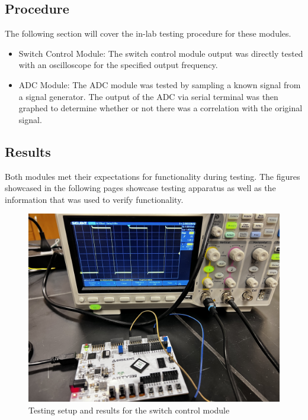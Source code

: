 \documentclass[titlepage]{article}
\begin{document}
\subsection{Procedure}
\label{testing procedure}
The following section will cover the in-lab testing procedure for these modules.

\begin{itemize}
    \item Switch Control Module: The switch control module output was directly tested with an oscilloscope for the specified output frequency.
    \item ADC Module: The ADC module was tested by sampling a known signal from a signal generator. The output of the ADC via serial terminal was then graphed to determine whether or not there was a correlation with the original signal.
\end{itemize}


\subsection{Results}
\label{testing results}
Both modules met their expectations for functionality during testing. The figures showcased in the following pages showcase testing apparatus as well as the information that was used to verify functionality. 

\newpage

\begin{figure}[h]
    \includegraphics[width=\textwidth]{assets/pwmtest.jpg}
    \centering
    \caption{Testing setup and results for the switch control module}
\end{figure}
\label{figure3}
\end{document}
